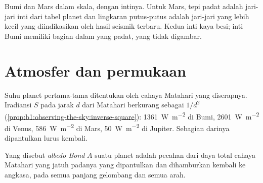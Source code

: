 \begin{omfigure}

{\small Bumi dan Mars dalam skala, dengan intinya. Untuk Mars, tepi padat adalah jari-jari inti dari tabel planet dan lingkaran putus-putus adalah jari-jari yang lebih kecil yang diindikasikan oleh hasil seismik terbaru. Kedua inti kaya besi; inti Bumi memiliki bagian dalam yang padat, yang tidak digambar.}
\end{omfigure}

\section{Atmosfer dan permukaan}

Suhu planet pertama-tama ditentukan oleh cahaya Matahari yang diserapnya. Iradiansi $S$ pada jarak $d$ dari Matahari berkurang sebagai $1/d^2$ (\cref{prop:b1:observing-the-sky:inverse-square}): \qty{1361}{W.m^{-2}} di Bumi, \qty{2601}{W.m^{-2}} di Venus, \qty{586}{W.m^{-2}} di Mars, \qty{50}{W.m^{-2}} di Jupiter. Sebagian darinya dipantulkan lurus kembali.

\begin{definition}\label{def:b1:comparative-planetology:albedo}
Yang disebut \emph{albedo Bond} $A$ suatu planet adalah pecahan dari daya total cahaya Matahari yang jatuh padanya yang dipantulkan dan dihamburkan kembali ke angkasa, pada semua panjang gelombang dan semua arah.
\end{definition}

